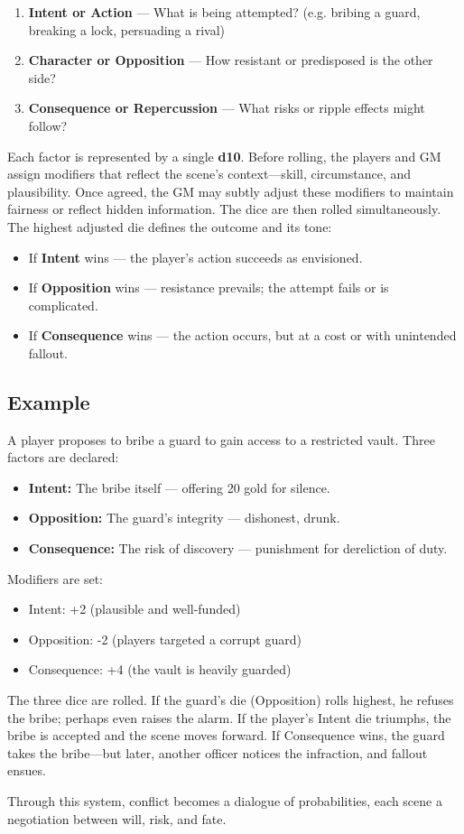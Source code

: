 \begin{enumerate}
  \item \textbf{Intent or Action} — What is being attempted? (e.g. bribing a guard, breaking a lock, persuading a rival)
  \item \textbf{Character or Opposition} — How resistant or predisposed is the other side?
  \item \textbf{Consequence or Repercussion} — What risks or ripple effects might follow?
\end{enumerate}

Each factor is represented by a single \textbf{d10}.  
Before rolling, the players and GM assign modifiers that reflect the scene’s context—skill, circumstance, and plausibility.  
Once agreed, the GM may subtly adjust these modifiers to maintain fairness or reflect hidden information.  
The dice are then rolled simultaneously.  
The highest adjusted die defines the outcome and its tone:

\begin{itemize}
  \item If \textbf{Intent} wins — the player’s action succeeds as envisioned.
  \item If \textbf{Opposition} wins — resistance prevails; the attempt fails or is complicated.
  \item If \textbf{Consequence} wins — the action occurs, but at a cost or with unintended fallout.
\end{itemize}

\subsection*{Example}

A player proposes to bribe a guard to gain access to a restricted vault.  
Three factors are declared:

\begin{itemize}
  \item \textbf{Intent:} The bribe itself — offering 20 gold for silence.  
  \item \textbf{Opposition:} The guard’s integrity — dishonest, drunk.  
  \item \textbf{Consequence:} The risk of discovery — punishment for dereliction of duty.
\end{itemize}

Modifiers are set:
\begin{itemize}
  \item Intent: +2 (plausible and well-funded)  
  \item Opposition: -2 (players targeted a corrupt guard)  
  \item Consequence: +4 (the vault is heavily guarded)
\end{itemize}

The three dice are rolled.  
If the guard’s die (Opposition) rolls highest, he refuses the bribe; perhaps even raises the alarm.  
If the player’s Intent die triumphs, the bribe is accepted and the scene moves forward.  
If Consequence wins, the guard takes the bribe—but later, another officer notices the infraction, and fallout ensues.

Through this system, conflict becomes a dialogue of probabilities, each scene a negotiation between will, risk, and fate.
